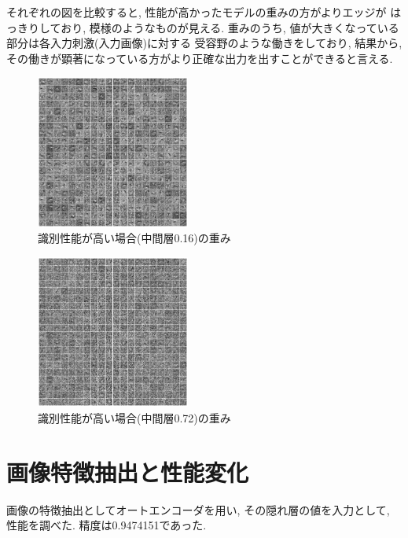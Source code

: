 \documentclass[10pt,a4paper,twocolumn]{jarticle}
\begin{document}
それぞれの図を比較すると, 性能が高かったモデルの重みの方がよりエッジが
はっきりしており, 模様のようなものが見える. 
重みのうち, 値が大きくなっている部分は各入力刺激(入力画像)に対する
受容野のような働きをしており, 結果から, 
その働きが顕著になっている方がより正確な出力を出すことができると言える. 
\begin{figure}[htbp] 
  \centering
  \includegraphics[width=0.45\textwidth]{assets/img/n_hidden_test_mnist_image_nsmpl150000_nh0.16.eps}
  \caption{識別性能が高い場合(中間層0.16)の重み}
  \label{fig:hidden-layer-analyze-img-0.16}
\end{figure}
\begin{figure}[htbp] 
  \centering
  \includegraphics[width=0.45\textwidth]{assets/img/n_hidden_test_mnist_image_nsmpl150000_nh0.72.eps}
  \caption{識別性能が高い場合(中間層0.72)の重み}
  \label{fig:hidden-layer-analyze-img-0.72}
\end{figure}
\section{画像特徴抽出と性能変化}
画像の特徴抽出としてオートエンコーダを用い, その隠れ層の値を入力として, 
性能を調べた. 
精度は0.9474151であった. 
\end{document}

